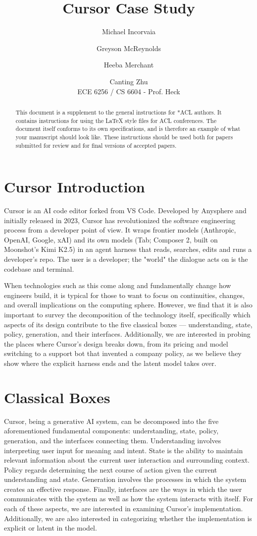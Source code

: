 \documentclass[11pt]{article}
\title{Cursor Case Study}
\author{Michael Incorvaia \and Greyson McReynolds \and Heeba Merchant \and Canting Zhu \\
       ECE 6256 / CS 6604 - Prof. Heck}
\begin{document}
\maketitle
\begin{abstract}
This document is a supplement to the general instructions for *ACL authors. It contains instructions for using the \LaTeX{} style files for ACL conferences.
The document itself conforms to its own specifications, and is therefore an example of what your manuscript should look like.
These instructions should be used both for papers submitted for review and for final versions of accepted papers.
\end{abstract}

\section{Cursor Introduction}

Cursor is an AI code editor forked from VS Code. Developed by Anysphere and initially released in 2023, Cursor has revolutionized the software engineering process from a developer point of view. It wraps frontier models (Anthropic, OpenAI, Google, xAI) and its own models (Tab; Composer 2, built on Moonshot's Kimi K2.5) in an agent harness that reads, searches, edits and runs a developer's repo. The user is a developer; the "world" the dialogue acts on is the codebase and terminal.

When technologies such as this come along and fundamentally change how engineers build, it is typical for those to want to focus on continuities, changes, and overall implications on the computing sphere. However, we find that it is also important to survey the decomposition of the technology itself, specifically which aspects of its design contribute to the five classical boxes — understanding, state, policy, generation, and their interfaces. Additionally, we are interested in probing the places where Cursor’s design breaks down, from its pricing and model switching to a support bot that invented a company policy, as we believe they show where the explicit harness ends and the latent model takes over.

\section{Classical Boxes}

Cursor, being a generative AI system, can be decomposed into the five aforementioned fundamental components: understanding, state, policy, generation, and the interfaces connecting them. Understanding involves interpreting user input for meaning and intent. State is the ability to maintain relevant information about the current user interaction and surrounding context. Policy regards determining the next course of action given the current understanding and state. Generation involves the processes in which the system creates an effective response. Finally, interfaces are the ways in which the user communicates with the system as well as how the system interacts with itself. For each of these aspects, we are interested in examining Cursor’s implementation. Additionally, we are also interested in categorizing whether the implementation is explicit or latent in the model.
\end{document}
